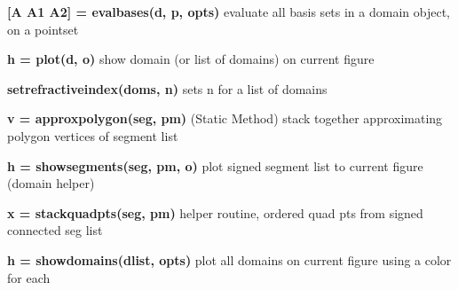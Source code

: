 \textbf{[A A1 A2] = evalbases(d, p, opts)} evaluate all basis sets in
a domain object, on a pointset

\textbf{h = plot(d, o)} show domain (or list of domains) on current figure

\textbf{setrefractiveindex(doms, n)} sets n for a list of domains

\textbf{v = approxpolygon(seg, pm)} (Static Method) stack together
approximating polygon vertices of segment list

\textbf{h = showsegments(seg, pm, o)} plot signed segment list to
current figure (domain helper)

\textbf{x = stackquadpts(seg, pm)} helper routine, ordered quad pts
from signed connected seg list 

\textbf{h = showdomains(dlist, opts)} plot all domains on current
figure using a color for each




























